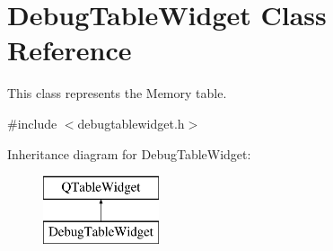 \hypertarget{class_debug_table_widget}{}\section{Debug\+Table\+Widget Class Reference}
\label{class_debug_table_widget}


This class represents the Memory table.  




{\ttfamily \#include $<$debugtablewidget.\+h$>$}

Inheritance diagram for Debug\+Table\+Widget\+:\begin{figure}[H]
\begin{center}
\leavevmode
\includegraphics[height=2.000000cm]{class_debug_table_widget}
\end{center}
\end{figure}
